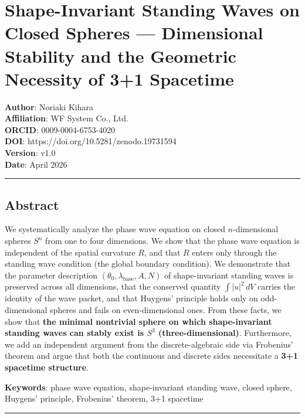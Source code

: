 \documentclass[
  a4paper,11pt]{article}
\theoremstyle{definition}
\theoremstyle{remark}
\begin{document}
\section{Shape-Invariant Standing Waves on Closed Spheres ---
Dimensional Stability and the Geometric Necessity of 3+1
Spacetime}\label{shape-invariant-standing-waves-on-closed-spheres-dimensional-stability-and-the-geometric-necessity-of-31-spacetime}

\textbf{Author}: Noriaki Kihara\\
\textbf{Affiliation}: WF System Co., Ltd.\\
\textbf{ORCID}: 0009-0004-6753-4020\\
\textbf{DOI}: https://doi.org/10.5281/zenodo.19731594\\
\textbf{Version}: v1.0\\
\textbf{Date}: April 2026

\begin{center}\rule{0.5\linewidth}{0.5pt}\end{center}

\subsection{Abstract}\label{abstract}

We systematically analyze the phase wave equation on closed
\(n\)-dimensional spheres \(S^n\) from one to four dimensions. We show
that the phase wave equation is independent of the spatial curvature
\(R\), and that \(R\) enters only through the standing wave condition
(the global boundary condition). We demonstrate that the parameter
description \((\theta_0, \lambda_{\text{base}}, A, N)\) of
shape-invariant standing waves is preserved across all dimensions, that
the conserved quantity \(\int |u|^2 \, dV\) carries the identity of the
wave packet, and that Huygens' principle holds only on odd-dimensional
spheres and fails on even-dimensional ones. From these facts, we show
that \textbf{the minimal nontrivial sphere on which shape-invariant
standing waves can stably exist is \(S^3\) (three-dimensional)}.
Furthermore, we add an independent argument from the discrete-algebraic
side via Frobenius' theorem and argue that both the continuous and
discrete sides necessitate a \textbf{3+1 spacetime structure}.

\textbf{Keywords}: phase wave equation, shape-invariant standing wave,
closed sphere, Huygens' principle, Frobenius' theorem, 3+1 spacetime

\begin{center}\rule{0.5\linewidth}{0.5pt}\end{center}
\end{document}

